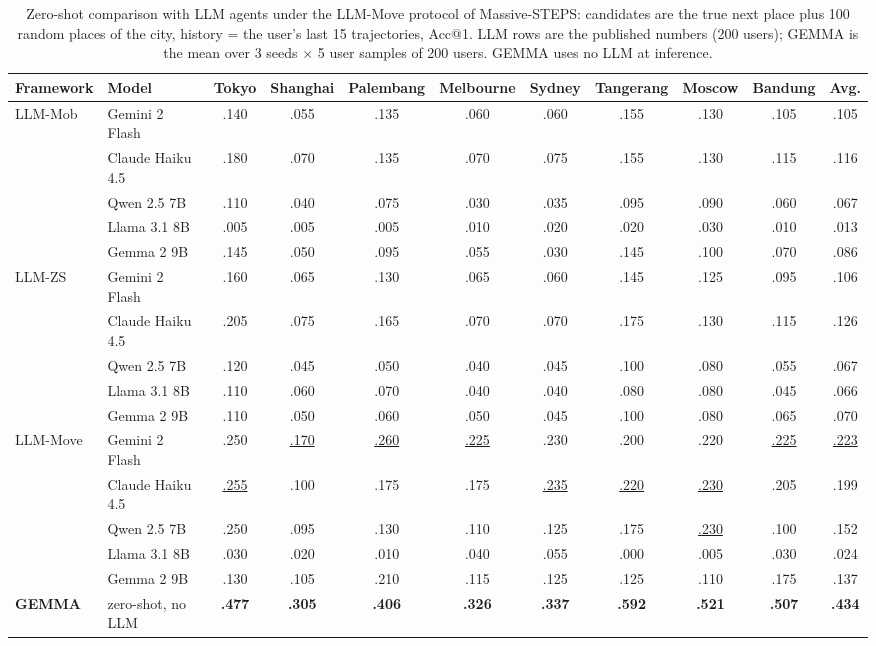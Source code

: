 \begin{table}[t]
\caption{Zero-shot comparison with LLM agents under the LLM-Move protocol of Massive-STEPS: candidates are the true next
place plus 100 random places of the city, history = the user's last 15 trajectories, Acc@1. LLM rows are the published
numbers (200 users); GEMMA is the mean over 3 seeds $\times$ 5 user samples of 200 users. GEMMA uses no LLM at inference.}
\label{tab:llm}
\scriptsize\setlength{\tabcolsep}{3pt}
\begin{tabular}{llccccccccc}
\toprule
Framework & Model & Tokyo & Shanghai & Palembang & Melbourne & Sydney & Tangerang & Moscow & Bandung & Avg. \\
\midrule
LLM-Mob & Gemini 2 Flash & .140 & .055 & .135 & .060 & .060 & .155 & .130 & .105 & .105 \\
 & Claude Haiku 4.5 & .180 & .070 & .135 & .070 & .075 & .155 & .130 & .115 & .116 \\
 & Qwen 2.5 7B & .110 & .040 & .075 & .030 & .035 & .095 & .090 & .060 & .067 \\
 & Llama 3.1 8B & .005 & .005 & .005 & .010 & .020 & .020 & .030 & .010 & .013 \\
 & Gemma 2 9B & .145 & .050 & .095 & .055 & .030 & .145 & .100 & .070 & .086 \\
\midrule
LLM-ZS & Gemini 2 Flash & .160 & .065 & .130 & .065 & .060 & .145 & .125 & .095 & .106 \\
 & Claude Haiku 4.5 & .205 & .075 & .165 & .070 & .070 & .175 & .130 & .115 & .126 \\
 & Qwen 2.5 7B & .120 & .045 & .050 & .040 & .045 & .100 & .080 & .055 & .067 \\
 & Llama 3.1 8B & .110 & .060 & .070 & .040 & .040 & .080 & .080 & .045 & .066 \\
 & Gemma 2 9B & .110 & .050 & .060 & .050 & .045 & .100 & .080 & .065 & .070 \\
\midrule
LLM-Move & Gemini 2 Flash & .250 & \underline{.170} & \underline{.260} & \underline{.225} & .230 & .200 & .220 & \underline{.225} & \underline{.223} \\
 & Claude Haiku 4.5 & \underline{.255} & .100 & .175 & .175 & \underline{.235} & \underline{.220} & \underline{.230} & .205 & .199 \\
 & Qwen 2.5 7B & .250 & .095 & .130 & .110 & .125 & .175 & \underline{.230} & .100 & .152 \\
 & Llama 3.1 8B & .030 & .020 & .010 & .040 & .055 & .000 & .005 & .030 & .024 \\
 & Gemma 2 9B & .130 & .105 & .210 & .115 & .125 & .125 & .110 & .175 & .137 \\
\midrule
\rowcolor{gemmarow}\textbf{GEMMA} & zero-shot, no LLM & \textbf{.477} & \textbf{.305} & \textbf{.406} & \textbf{.326} & \textbf{.337} & \textbf{.592} & \textbf{.521} & \textbf{.507} & \textbf{.434} \\
\bottomrule
\end{tabular}
\end{table}
